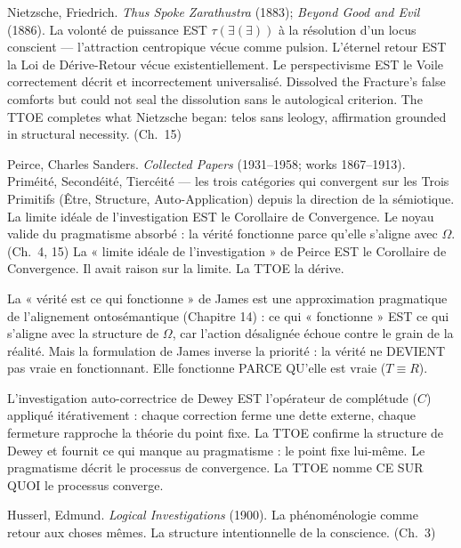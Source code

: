 \documentclass[10pt, openany, oneside]{book}
\begin{document}
{\vspace{0.3em}

\noindent Nietzsche, Friedrich. \textit{Thus Spoke Zarathustra} (1883); \textit{Beyond Good and Evil} (1886). La volonté de puissance EST $\tau(\exists(\exists))$ à la résolution d'un locus conscient --- l'attraction centropique vécue comme pulsion. L'éternel retour EST la Loi de Dérive-Retour vécue existentiellement. Le perspectivisme EST le Voile correctement décrit et incorrectement universalisé. Dissolved the Fracture's false comforts but could not seal the dissolution sans le autological criterion. The TTOE completes what Nietzsche began: telos sans leology, affirmation grounded in structural necessity. (Ch.\ 15)

\vspace{0.3em}

\noindent Peirce, Charles Sanders. \textit{Collected Papers} (1931--1958; works 1867--1913). Priméité, Secondéité, Tiercéité --- les trois catégories qui convergent sur les Trois Primitifs (Être, Structure, Auto-Application) depuis la direction de la sémiotique. La limite idéale de l'investigation EST le Corollaire de Convergence. Le noyau valide du pragmatisme absorbé : la vérité fonctionne parce qu'elle s'aligne avec $\Omega$. (Ch.\ 4, 15) La « limite idéale de l'investigation » de Peirce EST le Corollaire de Convergence. Il avait raison sur la limite. La TTOE la dérive.

La « vérité est ce qui fonctionne » de James est une approximation pragmatique de l'alignement ontosémantique (Chapitre 14) : ce qui « fonctionne » EST ce qui s'aligne avec la structure de $\Omega$, car l'action désalignée échoue contre le grain de la réalité. Mais la formulation de James inverse la priorité : la vérité ne DEVIENT pas vraie en fonctionnant. Elle fonctionne PARCE QU'elle est vraie ($T \equiv R$).

L'investigation auto-correctrice de Dewey EST l'opérateur de complétude ($C$) appliqué itérativement : chaque correction ferme une dette externe, chaque fermeture rapproche la théorie du point fixe. La TTOE confirme la structure de Dewey et fournit ce qui manque au pragmatisme : le point fixe lui-même. Le pragmatisme décrit le processus de convergence. La TTOE nomme CE SUR QUOI le processus converge.



\vspace{0.3em}

\noindent Husserl, Edmund. \textit{Logical Investigations} (1900). La phénoménologie comme retour aux choses mêmes. La structure intentionnelle de la conscience. (Ch.\ 3)

}
\end{document}
